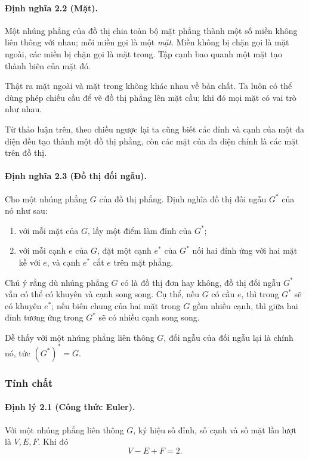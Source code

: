 \documentclass[11pt]{article}
\begin{document}
\paragraph{Định nghĩa 2.2 (Mặt).}
Một nhúng phẳng của đồ thị chia toàn bộ mặt phẳng thành một số miền không liên
thông với nhau; mỗi miền gọi là một \emph{mặt}. Miền không bị chặn gọi là mặt
ngoài, các miền bị chặn gọi là mặt trong. Tập cạnh bao quanh một mặt tạo thành
biên của mặt đó.

Thật ra mặt ngoài và mặt trong không khác nhau về bản chất. Ta luôn có thể dùng
phép chiếu cầu để vẽ đồ thị phẳng lên mặt cầu; khi đó mọi mặt có vai trò như
nhau.

Từ thảo luận trên, theo chiều ngược lại ta cũng biết các đỉnh và cạnh của một
đa diện đều tạo thành một đồ thị phẳng, còn các mặt của đa diện chính là các
mặt trên đồ thị.

\paragraph{Định nghĩa 2.3 (Đồ thị đối ngẫu).}
Cho một nhúng phẳng $G$ của đồ thị phẳng. Định nghĩa đồ thị đối ngẫu $G^*$ của
nó như sau:
\begin{enumerate}
  \item với mỗi mặt của $G$, lấy một điểm làm đỉnh của $G^*$;
  \item với mỗi cạnh $e$ của $G$, đặt một cạnh $e^*$ của $G^*$ nối hai đỉnh ứng
  với hai mặt kề với $e$, và cạnh $e^*$ cắt $e$ trên mặt phẳng.
\end{enumerate}

Chú ý rằng dù nhúng phẳng $G$ có là đồ thị đơn hay không, đồ thị đối ngẫu $G^*$
vẫn có thể có khuyên và cạnh song song. Cụ thể, nếu $G$ có cầu $e$, thì trong
$G^*$ sẽ có khuyên $e^*$; nếu biên chung của hai mặt trong $G$ gồm nhiều cạnh,
thì giữa hai đỉnh tương ứng trong $G^*$ sẽ có nhiều cạnh song song.

Dễ thấy với một nhúng phẳng liên thông $G$, đối ngẫu của đối ngẫu lại là chính
nó, tức $(G^*)^*=G$.

\subsubsection{Tính chất}

\paragraph{Định lý 2.1 (Công thức Euler).}
Với một nhúng phẳng liên thông $G$, ký hiệu số đỉnh, số cạnh và số mặt lần lượt
là $V,E,F$. Khi đó
\[
  V-E+F=2.
\]
\end{document}

